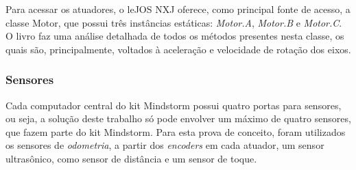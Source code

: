 		Para acessar os atuadores, o leJOS NXJ oferece, como principal fonte de acesso, a classe Motor, que possui três instâncias estáticas: \textit{Motor.A}, \textit{Motor.B} e \textit{Motor.C}. O livro \cite{legonxj} faz uma análise detalhada de todos os métodos presentes nesta classe, os quais são, principalmente, voltados à aceleração e velocidade de rotação dos eixos.

	\subsubsection{Sensores}

		Cada computador central do kit Mindstorm possui quatro portas para sensores, ou seja, a solução deste trabalho só pode envolver um máximo de quatro sensores, que fazem parte do kit Mindstorm. Para esta prova de conceito, foram utilizados os sensores de \textit{odometria}, a partir dos \textit{encoders} em cada atuador, um sensor ultrasônico, como sensor de distância e um sensor de toque.

